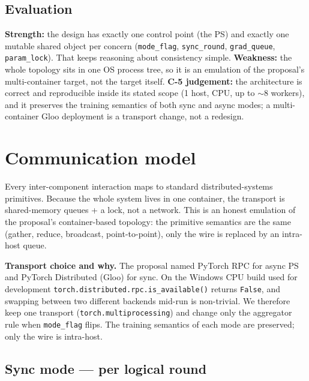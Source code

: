 \documentclass[11pt,a4paper]{article}
\begin{document}
\subsection{Evaluation}
\textbf{Strength:} the design has exactly one control point (the PS) and exactly one mutable shared object per concern (\texttt{mode\_flag}, \texttt{sync\_round}, \texttt{grad\_queue}, \texttt{param\_lock}). That keeps reasoning about consistency simple. \textbf{Weakness:} the whole topology sits in one OS process tree, so it is an emulation of the proposal's multi-container target, not the target itself. \textbf{C-5 judgement:} the architecture is correct and reproducible inside its stated scope (1 host, CPU, up to ${\sim}8$ workers), and it preserves the training semantics of both sync and async modes; a multi-container Gloo deployment is a transport change, not a redesign.

\section{Communication model}

Every inter-component interaction maps to standard distributed-systems primitives. Because the whole system lives in one container, the transport is shared-memory queues + a lock, not a network. This is an honest emulation of the proposal's container-based topology: the primitive semantics are the same (gather, reduce, broadcast, point-to-point), only the wire is replaced by an intra-host queue.

\textbf{Transport choice and why.} The proposal named PyTorch RPC for async PS and PyTorch Distributed (Gloo) for sync. On the Windows CPU build used for development \texttt{torch.distributed.rpc.is\_available()} returns \texttt{False}, and swapping between two different backends mid-run is non-trivial. We therefore keep one transport (\texttt{torch.multiprocessing}) and change only the aggregator rule when \texttt{mode\_flag} flips. The training semantics of each mode are preserved; only the wire is intra-host.

\subsection{Sync mode --- per logical round}
\end{document}
